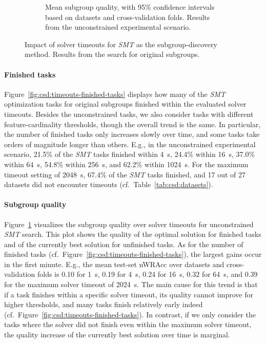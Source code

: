\documentclass{article}
\theoremstyle{definition}
\begin{document}
\begin{figure}[t]
\begin{subfigure}[t]{0.48\textwidth}
		\caption{
			Mean subgroup quality, with 95\% confidence intervals based on datasets and cross-validation folds.
			Results from the unconstrained experimental scenario.
		}
		\label{fig:csd:timeouts-nwracc}
	\end{subfigure}
	\caption{
		Impact of solver timeouts for \emph{SMT} as the subgroup-discovery method.
		Results from the search for original subgroups.
	}
	\label{fig:csd:timeouts}
\end{figure}

\paragraph{Finished tasks}

Figure~\ref{fig:csd:timeouts-finished-tasks} displays how many of the \emph{SMT} optimization tasks for original subgroups finished within the evaluated solver timeouts.
Besides the unconstrained tasks, we also consider tasks with different feature-cardinality thresholds, though the overall trend is the same.
In particular, the number of finished tasks only increases slowly over time, and some tasks take orders of magnitude longer than others.
E.g., in the unconstrained experimental scenario, 21.5\% of the \emph{SMT} tasks finished within 4~s, 24.4\% within 16~s, 37.0\% within 64~s, 54.8\% within 256~s, and 62.2\% within 1024~s.
For the maximum timeout setting of 2048~s, 67.4\% of the \emph{SMT} tasks finished, and 17 out of 27 datasets did not encounter timeouts (cf.~Table~\ref{tab:csd:datasets}).

\paragraph{Subgroup quality}

Figure~\ref{fig:csd:timeouts-nwracc} visualizes the subgroup quality over solver timeouts for unconstrained \emph{SMT} search.
This plot shows the quality of the optimal solution for finished tasks and of the currently best solution for unfinished tasks.
As for the number of finished tasks (cf.~Figure~\ref{fig:csd:timeouts-finished-tasks}), the largest gains occur in the first minute.
E.g., the mean test-set nWRAcc over datasets and cross-validation folds is 0.10 for 1~s, 0.19 for 4~s, 0.24 for 16~s, 0.32 for 64~s, and 0.39 for the maximum solver timeout of 2024~s.
The main cause for this trend is that if a task finishes within a specific solver timeout, its quality cannot improve for higher thresholds, and many tasks finish relatively early indeed (cf.~Figure~\ref{fig:csd:timeouts-finished-tasks}).
In contrast, if we only consider the tasks where the solver did not finish even within the maximum solver timeout, the quality increase of the currently best solution over time is marginal.
\end{document}
